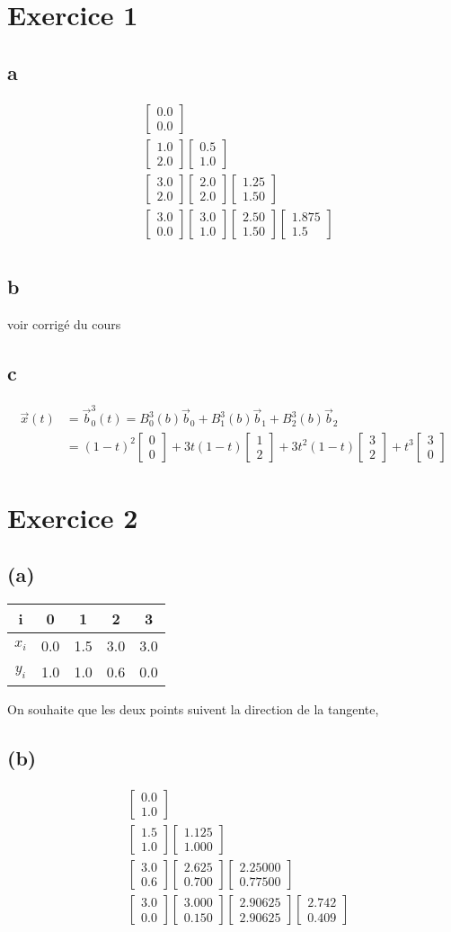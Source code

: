 \documentclass[a4paper,9pt]{extarticle}
\newcommand{\matv}[2]{\begin{bmatrix}#1 \\ #2 \end{bmatrix}}
\begin{document}
\section{Exercice 1}
\subsection{a}
\begin{align*}
&\matv{0.0}{0.0} \\
&\matv{1.0}{2.0} \matv{0.5}{1.0}\\
&\matv{3.0}{2.0} \matv{2.0}{2.0} \matv{1.25}{1.50}\\
&\matv{3.0}{0.0} \matv{3.0}{1.0} \matv{2.50}{1.50} \matv{1.875}{1.5}\\
\end{align*}
\subsection{b}
voir corrigé du cours
\subsection{c}
\begin{align*}
\vec{x}(t) &= \vec{b}_0^3(t) = B_0^3(b)\vec{b}_0 + B_1^3(b)\vec{b}_1 + B_2^3(b)\vec{b}_2 \\
           &= (1-t)^2 \matv{0}{0} + 3t(1-t) \matv{1}{2} + 3t^2(1-t)\matv{3}{2} + t^3\matv{3}{0}
\end{align*}
\section{Exercice 2}
\subsection*{(a)}
\begin{center}
\begin{tabular}{|c|c|c|c|c|}
\hline 
i & 0 & 1 & 2 & 3 \\ \hline\hline 
$x_i$ & 0.0 & 1.5 & 3.0 & 3.0 \\ \hline 
$y_i$ & 1.0 & 1.0 & 0.6 & 0.0 \\ \hline 
\end{tabular}
\end{center}

On souhaite que les deux points suivent la direction de la tangente, 
\subsection*{(b)}
\begin{align*}
& \matv{0.0}{1.0} \\
& \matv{1.5}{1.0} \matv{1.125}{1.000} \\
& \matv{3.0}{0.6} \matv{2.625}{0.700} \matv{2.25000}{0.77500} \\
& \matv{3.0}{0.0} \matv{3.000}{0.150} \matv{2.90625}{2.90625} \matv{2.742}{0.409} \\
\end{align*}
\end{document}
